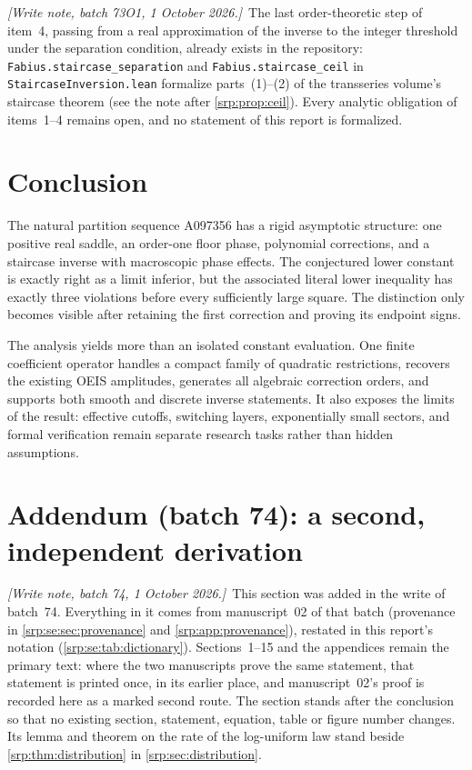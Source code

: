 \documentclass[11pt,a4paper]{article}
\numberwithin{equation}{section}
\theoremstyle{definition}
\theoremstyle{remark}
\newcommand{\writenote}[1]{\par\smallskip\noindent
 \textit{[Write note, batch 73O1, 1 October 2026.]}\ #1\par\smallskip}
\newcommand{\writenotefour}[1]{\par\smallskip\noindent
 \textit{[Write note, batch 74, 1 October 2026.]}\ #1\par\smallskip}
\begin{document}
\writenote{The last order-theoretic step of item~4, passing from a real
approximation of the inverse to the integer threshold under the
separation condition, already exists in the repository:
\texttt{Fabius.staircase\_separation} and \texttt{Fabius.staircase\_ceil}
in \nolinkurl{StaircaseInversion.lean} \cite{proveitLean} formalize
parts~(1)--(2) of the transseries volume's staircase theorem (see the
note after \cref{srp:prop:ceil}). Every analytic obligation of items~1--4
remains open, and no statement of this report is formalized.}

\section{Conclusion}
The natural partition sequence A097356 has a rigid asymptotic structure:
one positive real saddle, an order-one floor phase, polynomial
corrections, and a staircase inverse with macroscopic phase effects.
The conjectured lower constant is exactly right as a limit inferior,
but the associated literal lower inequality has exactly three
violations before every sufficiently large square. The distinction
only becomes visible after retaining the first correction and proving
its endpoint signs.

The analysis yields more than an isolated constant evaluation. One
finite coefficient operator handles a compact family of quadratic
restrictions, recovers the existing OEIS amplitudes, generates all
algebraic correction orders, and supports both smooth and discrete
inverse statements. It also exposes the limits of the result: effective
cutoffs, switching layers, exponentially small sectors, and formal
verification remain separate research tasks rather than hidden
assumptions.

\section{Addendum (batch 74): a second, independent derivation}
\label{srp:se:sec:second}

\setcounter{srpsavedtable}{\value{table}}
\setcounter{table}{0}
\renewcommand{\thetable}{\thesection.\arabic{table}}
\renewcommand{\theHtable}{se.\arabic{table}}

\writenotefour{This section was added in the write of batch~74. Everything
in it comes from manuscript~02 of that batch (provenance in
\cref{srp:se:sec:provenance} and \cref{srp:app:provenance}), restated in
this report's notation (\cref{srp:se:tab:dictionary}). Sections~1--15 and
the appendices remain the primary text: where the two manuscripts prove
the same statement, that statement is printed once, in its earlier place,
and manuscript~02's proof is recorded here as a marked second route. The
section stands after the conclusion so that no existing section, statement,
equation, table or figure number changes. Its lemma and theorem on the rate
of the log-uniform law stand beside \cref{srp:thm:distribution} in
\cref{srp:sec:distribution}.}
\end{document}
